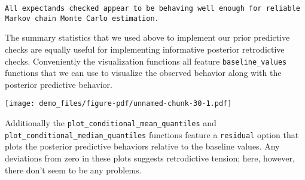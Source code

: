 \documentclass[
  letterpaper,
  DIV=11,
  numbers=noendperiod]{scrartcl}
\newenvironment{Shaded}{\begin{snugshade}}{\end{snugshade}}
\newcommand{\AttributeTok}[1]{\textcolor[rgb]{0.40,0.45,0.13}{#1}}
\newcommand{\DecValTok}[1]{\textcolor[rgb]{0.68,0.00,0.00}{#1}}
\newcommand{\FunctionTok}[1]{\textcolor[rgb]{0.28,0.35,0.67}{#1}}
\newcommand{\NormalTok}[1]{\textcolor[rgb]{0.00,0.23,0.31}{#1}}
\newcommand{\SpecialCharTok}[1]{\textcolor[rgb]{0.37,0.37,0.37}{#1}}
\newcommand{\StringTok}[1]{\textcolor[rgb]{0.13,0.47,0.30}{#1}}
\begin{document}
\begin{verbatim}
All expectands checked appear to be behaving well enough for reliable
Markov chain Monte Carlo estimation.
\end{verbatim}

The summary statistics that we used above to implement our prior
predictive checks are equally useful for implementing informative
posterior retrodictive checks. Conveniently the visualization functions
all feature \texttt{baseline\_values} functions that we can use to
visualize the observed behavior along with the posterior predictive
behavior.

\begin{Shaded}
\end{Shaded}

\texttt{[image: demo\_files/figure-pdf/unnamed-chunk-30-1.pdf]}

Additionally the \texttt{plot\_conditional\_mean\_quantiles} and
\texttt{plot\_conditional\_median\_quantiles} functions feature a
\texttt{residual} option that plots the posterior predictive behaviors
relative to the baseline values. Any deviations from zero in these plots
suggests retrodictive tension; here, however, there don't seem to be any
problems.
\end{document}
